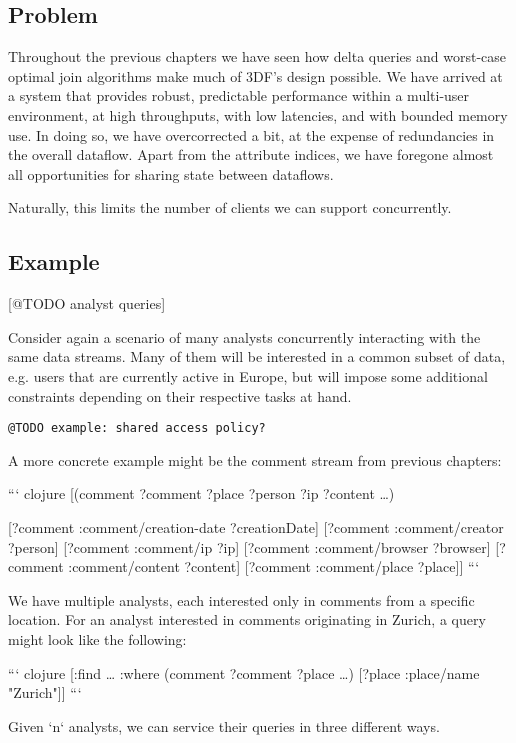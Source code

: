 \documentclass[../catalog.tex]{subfiles}
\begin{document}
\subsection{Problem}

Throughout the previous chapters we have seen how delta queries and
worst-case optimal join algorithms make much of 3DF's design
possible. We have arrived at a system that provides robust,
predictable performance within a multi-user environment, at high
throughputs, with low latencies, and with bounded memory use. In doing
so, we have overcorrected a bit, at the expense of redundancies in the
overall dataflow. Apart from the attribute indices, we have foregone
almost all opportunities for sharing state between dataflows.

Naturally, this limits the number of clients we can support
concurrently.

\subsection{Example}

[@TODO analyst queries]

Consider again a scenario of many analysts concurrently interacting
with the same data streams. Many of them will be interested in a
common subset of data, e.g. users that are currently active in Europe,
but will impose some additional constraints depending on their
respective tasks at hand.

\texttt{@TODO example: shared access policy?}

A more concrete example might be the comment stream from previous
chapters:

``` clojure
[(comment ?comment ?place ?person ?ip ?content \ldots{})

 [?comment :comment/creation-date ?creationDate]
 [?comment :comment/creator ?person]
 [?comment :comment/ip ?ip]
 [?comment :comment/browser ?browser]
 [?comment :comment/content ?content]
 [?comment :comment/place ?place]]
```

We have multiple analysts, each interested only in comments from a
specific location. For an analyst interested in comments originating
in Zurich, a query might look like the following:

``` clojure
[:find \ldots{}
 :where
 (comment ?comment ?place \ldots{})
 [?place :place/name "Zurich"]]
```

Given `n` analysts, we can service their queries in three different
ways.
\end{document}
